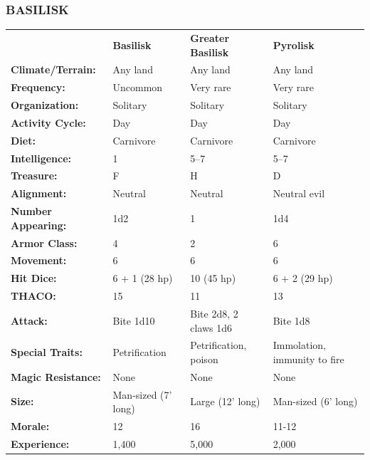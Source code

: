 \noindent \begin{minipage}{\columnwidth}

\subsubsection{BASILISK}

\noindent \begin{tabular}{p{}g{.23\columnwidth}p{.23\columnwidth}g{.23\columnwidth}}
	& \textbf{Basilisk}	& \textbf{Greater Basilisk}	& \textbf{Pyrolisk}	\\
\textbf{Climate/Terrain:}	& Any land	& Any land	& Any land	\\
\textbf{Frequency:} 		& Uncommon	& Very rare	& Very rare	\\
\textbf{Organization:} 		& Solitary	& Solitary	& Solitary	\\
\textbf{Activity Cycle:} 	& Day	& Day	& Day	\\
\textbf{Diet:} 				& Carnivore	& Carnivore	& Carnivore	\\
\textbf{Intelligence:} 		& 1	& 5--7	& 5--7	\\
\textbf{Treasure:} 			& F	& H	& D	\\
\textbf{Alignment:} 		& Neutral	& Neutral	& Neutral evil	\\
\hline
\textbf{Number Appearing:} 	& 1d2	& 1	& 1d4	\\
\textbf{Armor Class:} 		& 4	& 2	& 6	\\
\textbf{Movement:} 			& 6	& 6	& 6	\\
\textbf{Hit Dice:} 			& 6 + 1 (28 hp)	& 10 (45 hp)	& 6 + 2 (29 hp)	\\
\textbf{THACO:} 			& 15	& 11	& 13	\\
\textbf{Attack:} 			& Bite 1d10	& Bite 2d8, 2 claws 1d6	& Bite 1d8	\\
\textbf{Special Traits:} & Petrification	& Petrification, poison	& Immolation, immunity to fire	\\
\textbf{Magic Resistance:} 	& None	& None	& None	\\
\textbf{Size:} 				& Man-sized (7' long)	& Large (12' long)	& Man-sized (6' long)	\\
\textbf{Morale:} 			& 12	& 16	& 11-12	\\
\textbf{Experience:} 		& 1,400	& 5,000	& 2,000	\\ %
\end{tabular}

\end{minipage}

